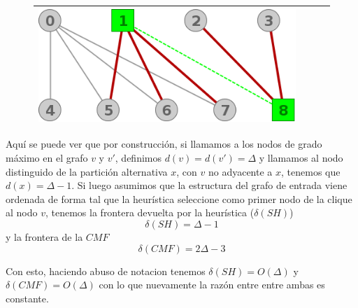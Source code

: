 \begin{figure}[H]
\begin{center}
\begin{tabular}{|c||c||c||c|}
			\includegraphics[scale = 0.2]{img/ej3/constructiva_golosa/k5,4Nocompleto_st12.png} \\
		\hline
		\end{tabular}
	\end{center}
	\end{figure}

	Aqu\'i se puede ver que por construcci\'on, si llamamos a los nodos de grado m\'aximo en el grafo
	$v$ y $v'$, definimos $d(v) = d(v') = \Delta$ y llamamos al nodo distinguido de la partici\'on
	alternativa $x$, con $v$ no adyacente a $x$, tenemos que $d(x) = \Delta -1$. 
	Si luego asumimos que la estructura del grafo de entrada viene ordenada de forma tal que la 
	heur\'istica seleccione como primer nodo de la clique al nodo $v$, tenemos la frontera
	devuelta por la heur\'istica ($\delta(SH)$)
	\[\delta(SH) = \Delta -1 \]
	y la frontera de la $CMF$
	\[\delta(CMF) = 2 \Delta -3 \]

	Con esto, haciendo abuso de notacion tenemos $\delta(SH) = O(\Delta)$ y $\delta(CMF) = O(\Delta)$ con 
	lo que nuevamente la raz\'on entre entre ambas es constante.

